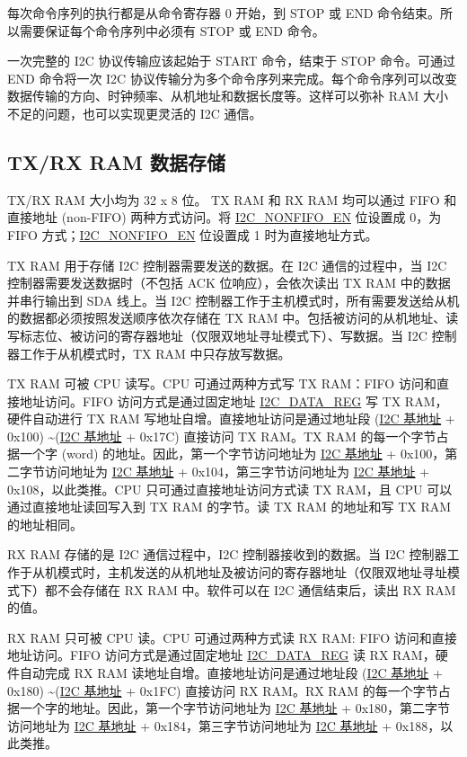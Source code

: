 \documentclass[main\_\_CN.tex]{subfiles}
\begin{document}
每次命令序列的执行都是从命令寄存器 0 开始，到 STOP 或 END 命令结束。所以需要保证每个命令序列中必须有 STOP 或 END 命令。

一次完整的 I2C 协议传输应该起始于 START 命令，结束于 STOP 命令。可通过 END 命令将一次 I2C 协议传输分为多个命令序列来完成。每个命令序列可以改变数据传输的方向、时钟频率、从机地址和数据长度等。这样可以弥补 RAM 大小不足的问题，也可以实现更灵活的 I2C 通信。

\subsection{TX/RX RAM 数据存储}\label{subsubsec:i2c-txrx}
TX/RX RAM 大小均为 32 x 8 位。 TX RAM 和 RX RAM 均可以通过 FIFO 和直接地址 (non-FIFO) 两种方式访问。将 \hyperref[fielddesc:I2CNONFIFOEN]{I2C\_NONFIFO\_EN} 位设置成 0，为 FIFO 方式；\hyperref[fielddesc:I2CNONFIFOEN]{I2C\_NONFIFO\_EN} 位设置成 1 时为直接地址方式。

TX RAM 用于存储 I2C 控制器需要发送的数据。在 I2C 通信的过程中，当 I2C 控制器需要发送数据时（不包括 ACK 位响应），会依次读出 TX RAM 中的数据并串行输出到 SDA 线上。当 I2C 控制器工作于主机模式时，所有需要发送给从机的数据都必须按照发送顺序依次存储在 TX RAM 中。包括被访问的从机地址、读写标志位、被访问的寄存器地址（仅限双地址寻址模式下）、写数据。当 I2C 控制器工作于从机模式时，TX RAM 中只存放写数据。

TX RAM 可被 CPU 读写。CPU 可通过两种方式写 TX RAM：FIFO 访问和直接地址访问。FIFO 访问方式是通过固定地址 \hyperref[regdesc:I2CDATAREG]{I2C\_DATA\_REG} 写 TX RAM，硬件自动进行 TX RAM 写地址自增。直接地址访问是通过地址段 (\hyperref[tab:sysmem-base-address]{I2C 基地址} + 0x100) \textasciitilde (\hyperref[tab:sysmem-base-address]{I2C 基地址} + 0x17C) 直接访问 TX RAM。TX RAM 的每一个字节占据一个字 (word) 的地址。因此，第一个字节访问地址为 \hyperref[tab:sysmem-base-address]{I2C 基地址} + 0x100，第二字节访问地址为 \hyperref[tab:sysmem-base-address]{I2C 基地址} + 0x104，第三字节访问地址为 \hyperref[tab:sysmem-base-address]{I2C 基地址} + 0x108，以此类推。CPU 只可通过直接地址访问方式读 TX RAM，且 CPU 可以通过直接地址读回写入到 TX RAM 的字节。读 TX RAM 的地址和写 TX RAM 的地址相同。

RX RAM 存储的是 I2C 通信过程中，I2C 控制器接收到的数据。当 I2C 控制器工作于从机模式时，主机发送的从机地址及被访问的寄存器地址（仅限双地址寻址模式下）都不会存储在 RX RAM 中。软件可以在 I2C 通信结束后，读出 RX RAM 的值。

RX RAM 只可被 CPU 读。CPU 可通过两种方式读 RX RAM: FIFO 访问和直接地址访问。FIFO 访问方式是通过固定地址 \hyperref[regdesc:I2CDATAREG]{I2C\_DATA\_REG} 读 RX RAM，硬件自动完成 RX RAM 读地址自增。直接地址访问是通过地址段 (\hyperref[tab:sysmem-base-address]{I2C 基地址} + 0x180) \textasciitilde (\hyperref[tab:sysmem-base-address]{I2C 基地址} + 0x1FC) 直接访问 RX RAM。RX RAM 的每一个字节占据一个字的地址。因此，第一个字节访问地址为 \hyperref[tab:sysmem-base-address]{I2C 基地址} + 0x180，第二字节访问地址为 \hyperref[tab:sysmem-base-address]{I2C 基地址} + 0x184，第三字节访问地址为 \hyperref[tab:sysmem-base-address]{I2C 基地址} + 0x188，以此类推。
\end{document}
